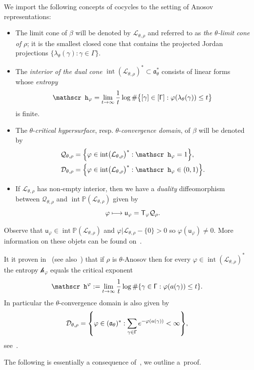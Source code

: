 \documentclass[AHL,Unicode,longabstracts,MathTools]{cedram}
\DeclareMathOperator{\inte}{int}
\newcommand{\cartan}{a}
\newcommand{\scr}{\mathscr}
\newcommand{\hJ}[1]{{\scr h}_{#1}}
\newcommand{\hC}[1]{{\scr h}^{#1}}
\renewcommand{\sf}[1]{{\mathsf{#1}}}
\newcommand{\G}{\sf{\Gamma}}
\newcommand{\cal}{\mathcal}
\newcommand{\calL}{\mathcal{L}}
\newcommand{\calQ}{\mathcal{Q}}
\renewcommand{\P}{\mathbb{P}}
\newcommand{\g}{\gamma}
\renewcommand{\t}{\theta}
\newcommand{\rfr}{\beta}
\renewcommand{\/}{\backslash}
\newcommand{\<}{\langle}
\renewcommand{\>}{\rangle}
\renewcommand{\a}{\mathfrak{a}}
\newcommand{\cdc}[1]{\bigl(\calL_{#1}\bigr)^*}
\renewcommand*{\to}{\mathchoice{\longrightarrow}{\rightarrow}{\rightarrow}{\rightarrow}}
\let\oldmapsto\mapsto
\renewcommand*{\mapsto}{\mathchoice{\longmapsto}{\oldmapsto}{\oldmapsto}{\oldmapsto}}
\let\originalleft\left
\let\originalright\right
\renewcommand{\left}{\mathopen{}\mathclose\bgroup\originalleft}
\renewcommand{\right}{\aftergroup\egroup\originalright}
\newcommand*{\MK}{\mkern 2mu}
\begin{document}
We import the following concepts of cocycles to the setting of Anosov representations:
\begin{itemize}
\item The limit cone of $\rfr$ will be denoted by $\calL_{\t,\rho}$ and referred to as \emph{the $\t$-limit cone of $\rho$}; it is the smallest closed cone that contains the projected Jordan projections $\{\lambda_\t(\g):\g\in\G\}$.

\item The \emph{interior of the dual cone} $\inte(\calL_{\t,\rho})^*\subset\a_\t^*$ consists of linear forms whose \emph{entropy}
\[
\hJ\varphi= \lim_{t\to\infty}\frac1t\log\#\bigl\{[\g]\in[\G]:\varphi(\lambda_\t(\g))\leq t\bigr\}
\]
is finite.

\item The $\t$-\emph{critical hypersurface}, resp. $\t$-\emph{convergence domain}, of $\rfr$ will be denoted by
\begin{align*}\label{qh2}
\calQ_{\t,\rho} & =\left\{\varphi\in\inte\cdc{\t,\rho}:\hJ\varphi=1\right\},\\
\cal D_{\t,\rho} & = \left\{\varphi\in\inte\cdc{\t,\rho}:\hJ\varphi\in(0,1)\right\}.
\end{align*}
\item If $\calL_{\t,\rho}$ has non-empty interior, then we have a \emph{duality} diffeomorphism between $\calQ_{\t,\rho}$ and $\inte\P(\calL_{\t,\rho})$ given by
\[
\varphi\mapsto\sf u_\varphi=\sf T_\varphi\calQ_\rho.
\]
\end{itemize}
Observe that $\sf u_\varphi\in\inte\P(\calL_{\t,\rho})$ and $\varphi|\calL_{\t,\rho}-\{0\}>0$ so $\varphi(\sf u_\varphi)\neq0$. More information on these objets can be found on~\cite[Section~5.9]{dichotomy}.

\begin{rema}\label{r.entropy=crit}
It it proven in~\cite[Theorem~2.31$\MK$(2)]{GMT}
(see also~\cite[Corollary~5.5.3]{dichotomy}) that if $\rho$ is $\t$-Anosov then for every $\varphi\in\inte(\calL_{\t,\rho})^*$ the entropy $\hJ\varphi$ equals the critical exponent
\[
\hC\varphi:= \lim_{t\to\infty}\frac1t\log\#\left\{\g\in\G:\varphi(\cartan(\g))\leq t\right\}.
\]
In particular the $\t$-convergence domain is also given by
\[
\cal D_{\t,\rho} =\left\{\varphi\in (\a_\t)^*:\sum_{\g\in\G}e^{-\varphi(\cartan(\g))}<\infty\right\},
\]
see~\cite[Section~5.7.2]{dichotomy}.
\end{rema}

The following is essentially a consequence of~\cite[Proposition~3.3.3]{Quint-Div},
we outline a~proof.
\end{document}
